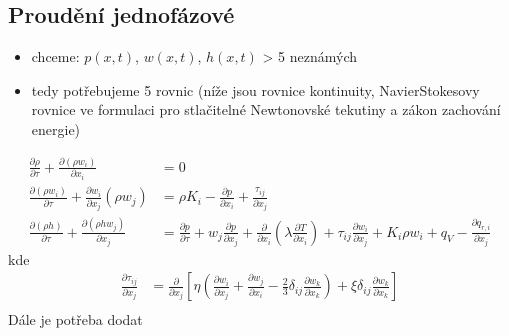 \documentclass[letterpaper,10pt,czech]{sphinxmanual}
\begin{document}
\subsection{Proudění \textendash{} jednofázové}
\label{\detokenize{prednaska_19092022:proudeni-jednofazove}}\begin{itemize}
\item {} 
\sphinxAtStartPar
chceme: \(p(x, t)\), \(w(x, t)\), \(h(x, t)\) \textendash{}\textgreater{} 5 neznámých

\item {} 
\sphinxAtStartPar
tedy potřebujeme 5 rovnic (níže jsou rovnice kontinuity, Navier\sphinxhyphen{}Stokesovy rovnice \textendash{} ve formulaci pro stlačitelné Newtonovské tekutiny a zákon zachování energie)

\end{itemize}
\begin{equation*}
\begin{split}    \frac{\partial \rho}{\partial \tau} + \frac{\partial (\rho w_i)}{\partial x_i} &= 0 \\
    \frac{\partial (\rho w_i)}{\partial \tau} + \frac{\partial w_i}{\partial x_j}(\rho w_j) &= \rho K_i - \frac{\partial p}{\partial x_i} + \frac{\tau_{ij}}{\partial x_j} \\
    \frac{\partial (\rho h)}{\partial \tau} + \frac{\partial (\rho h w_j)}{\partial x_j} &= \frac{\partial p}{\partial \tau} + w_j \frac{\partial p}{\partial x_j} + \frac{\partial}{\partial x_i}\left(\lambda \frac{\partial T}{\partial x_i}\right) + \tau_{ij} \frac{\partial w_i}{\partial x_j} + K_i \rho w_i + q_V - \frac{\partial q_{r,i}}{\partial x_j}
\end{split}
\end{equation*}
\sphinxAtStartPar
kde
\begin{equation*}
\begin{split}    \frac{\partial \tau_{ij}}{\partial x_j} &= \frac{\partial}{\partial x_j}\left[\eta\left(\frac{\partial w_i}{\partial x_j} + \frac{\partial w_j}{\partial x_i} - \frac{2}{3}\delta_{ij}\frac{\partial w_k}{\partial x_k}\right) + \xi \delta_{ij}\frac{\partial w_k}{\partial x_k}\right] \\\end{split}
\end{equation*}
\sphinxAtStartPar
Dále je potřeba dodat
\end{document}
